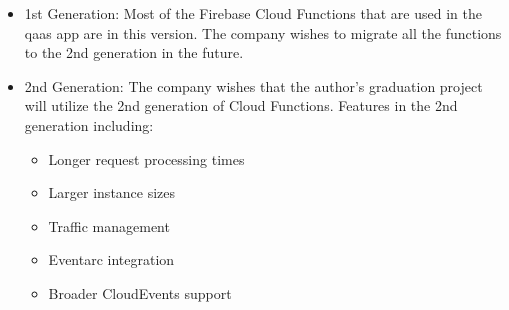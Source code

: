 \begin{multicols}{2}
\begin{itemize}
                  \begin{itemize}
                        \item 1st Generation: Most of the Firebase Cloud Functions that are used in the \acrshort{qaas} app
                              are in this version. The company wishes to migrate all the functions to the 2nd generation in
                              the future.
                        \item 2nd Generation: The company wishes that the author's graduation project will utilize the 2nd
                              generation of Cloud Functions. Features in the 2nd generation including:
                              \begin{itemize}
                                    \item Longer request processing times
                                    \item Larger instance sizes
                                    \item Traffic management
                                    \item Eventarc integration
                                    \item Broader CloudEvents support
                              \end{itemize}
                  \end{itemize}
      \end{itemize}
\end{multicols}

